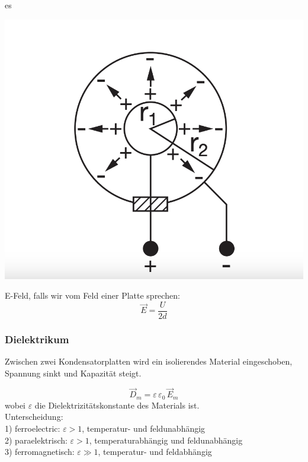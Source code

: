 es\documentclass[a4paper, fontsize=8pt, landscape]{scrartcl}
\begin{document}
\begin{multicols*}{4}
\begin{center}
            \includegraphics[scale=0.1]{Images/Kugelkondensator.png}
        \end{center}
        
         E-Feld, falls wir vom Feld einer Platte sprechen:
        \[\vec E = \frac{U}{2d}\]
    
    \subsubsection{Dielektrikum}
        Zwischen zwei Kondensatorplatten wird ein isolierendes Material eingeschoben, Spannung sinkt und Kapazität steigt.
        
        \[\vec D_m = \varepsilon\,\varepsilon_0\,\vec E_m\]
        wobei $\varepsilon$ die Dielektrizitätskonstante des Materials ist.\\
        Unterscheidung:\\
        1) ferroelectric: $\varepsilon > 1$, temperatur- und feldunabhängig\\
        2) paraelektrisch: $\varepsilon > 1$, temperaturabhängig und feldunabhängig\\
        3) ferromagnetisch: $\varepsilon \gg 1$, temperatur- und feldabhängig
        

\end{multicols*}
\end{document}
